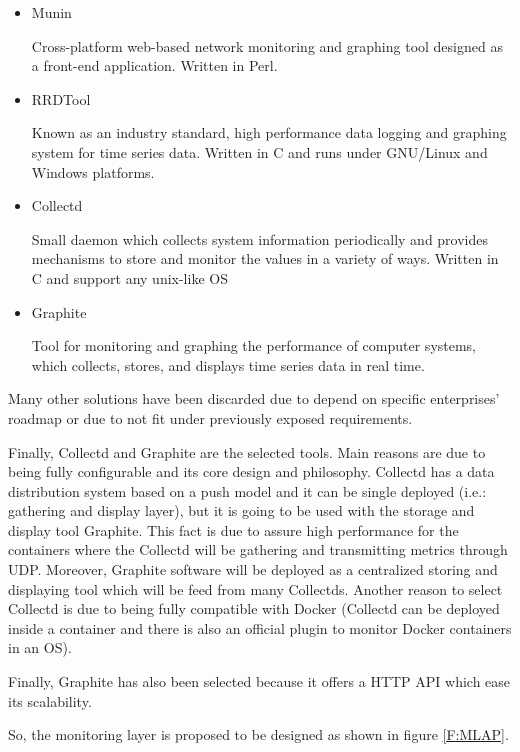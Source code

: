 \begin{itemize}
\item Munin \cite{munin}\hfill

Cross-platform web-based network monitoring and graphing tool designed as a front-end application. Written in Perl.

\item RRDTool \cite{rrdtool}\hfill

Known as an industry standard, high performance data logging and graphing system for time series data. Written in C and runs under GNU/Linux and Windows platforms.

\item Collectd \cite{collectd}\hfill

Small daemon which collects system information periodically and provides mechanisms to store and monitor the values in a variety of ways. Written in C and support any unix-like OS

\item Graphite \cite{graphite}\hfill

Tool for monitoring and graphing the performance of computer systems, which collects, stores, and displays time series data in real time.

\end{itemize}

Many other solutions have been discarded due to depend on specific enterprises' roadmap or due to not fit under previously exposed requirements.

Finally, Collectd and Graphite are the selected tools. Main reasons are due to being fully configurable and its core design and philosophy. Collectd has a data distribution system based on a push model and it can be single deployed (i.e.: gathering and display layer), but it is going to be used with the storage and display tool Graphite. This fact is due to assure high performance for the containers where the Collectd will be gathering and transmitting metrics through UDP. Moreover, Graphite software will be deployed as a centralized storing and displaying tool which will be feed from many Collectds. Another reason to select Collectd is due to being fully compatible with Docker (Collectd can be deployed inside a container and there is also an official plugin to monitor Docker containers in an OS). 

Finally, Graphite has also been selected because it offers a HTTP API which ease its scalability. 

So, the monitoring layer is proposed to be designed as shown in figure \ref{F:MLAP}.


